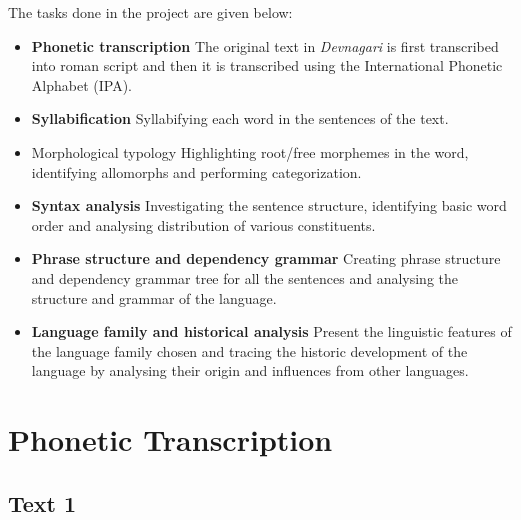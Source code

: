 \documentclass[17pt]{extarticle}
\begin{document}
The tasks done in the project are given below:
\begin{itemize}
    \item \textbf{Phonetic transcription}
    The original text in \emph{Devnagari} is first transcribed into roman script and then it is transcribed using the International Phonetic Alphabet (IPA).
    \item \textbf{Syllabification}
    Syllabifying each word in the sentences of the text.
    \item Morphological typology
    Highlighting root/free morphemes in the word, identifying allomorphs and performing categorization.
    \item \textbf{Syntax analysis}
    Investigating the sentence structure, identifying basic word order and analysing distribution of various constituents.
    \item \textbf{Phrase structure and dependency grammar}
    Creating phrase structure and dependency grammar tree for all the sentences and analysing the structure and grammar of the language.
    \item \textbf{Language family and historical analysis}
    Present the linguistic features of the language family chosen and tracing the historic development of the language by analysing their origin and influences from other languages.

\end{itemize}

\section*{\textbf{Phonetic Transcription}}

\subsection*{Text 1}
\end{document}
